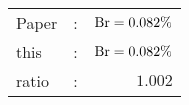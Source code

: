       \begin{tabular}{lcr}
          Paper &:& $\mathrm{Br}  = 0.082\%$ \\
          this      &:& $\mathrm{Br}  = 0.082\%$ \\
		  ratio   &:& $1.002$ \\
      \end{tabular}
